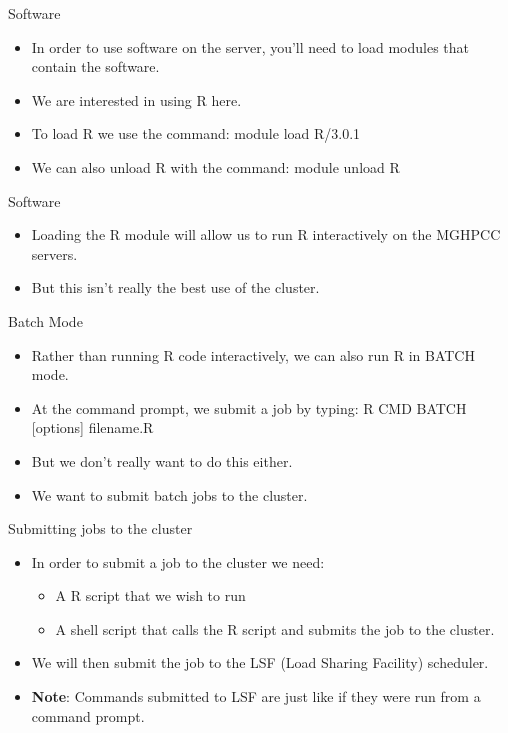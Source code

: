 \begin{frame}{Software}
\begin{itemize}
\item In order to use software on the server, you'll need to load modules that contain the software.  
\item We are interested in using R here.  
\item To load R we use the command: module load R/3.0.1
\item We can also unload R with the command:  module unload R
\end{itemize}
\end{frame}

\begin{frame}{Software}
\begin{itemize}
\item Loading the R module will allow us to run R interactively on the MGHPCC servers.  
\item But this isn't really the best use of the cluster.  
\end{itemize}
\end{frame}

\begin{frame}{Batch Mode}
\begin{itemize}
\item Rather than running R code interactively, we can also run R in BATCH mode.  
\item At the command prompt, we submit a job by typing: R CMD BATCH [options] filename.R
\item But we don't really want to do this either.  
\item We want to submit batch jobs to the cluster.  
\end{itemize}
\end{frame}

\begin{frame}{Submitting jobs to the cluster}
\begin{itemize}
\item In order to submit a job to the cluster we need: 
\begin{itemize}
\item A R script that we wish to run
\item A shell script that calls the R script and submits the job to the cluster.  
\end{itemize}
\item We will then submit the job to the LSF (Load Sharing Facility) scheduler.  
\item {\bf Note}: Commands submitted to LSF are just like if they were run from a command prompt. 
\end{itemize}
\end{frame}


